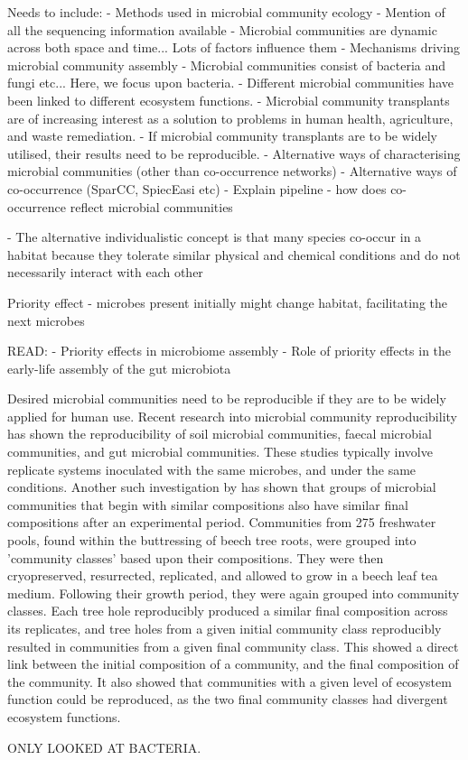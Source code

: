 \documentclass[11pt]{article}
\begin{document}
Needs to include:
- Methods used in microbial community ecology
- Mention of all the sequencing information available
- Microbial communities are dynamic across both space and time... Lots of factors influence them
- Mechanisms driving microbial community assembly
- Microbial communities consist of bacteria and fungi etc... Here, we focus upon bacteria.
- Different microbial communities have been linked to different ecosystem functions.
- Microbial community transplants are of increasing interest as a solution to problems in human health, agriculture, and waste remediation.
- If microbial community transplants are to be widely utilised, their results need to be reproducible.
- Alternative ways of characterising microbial communities (other than co-occurrence networks)
- Alternative ways of co-occurrence (SparCC, SpiecEasi etc)
- Explain pipeline - how does co-occurrence reflect microbial communities

- The alternative individualistic concept is that many species co-occur in a habitat because they tolerate similar physical and chemical conditions and do not necessarily interact with each other \citep{Konopka2009}

Priority effect - microbes present initially might change habitat, facilitating the next microbes \citep{Toju2018}

READ:
- Priority effects in microbiome assembly
- Role of priority effects in the early-life assembly of the gut microbiota

Desired microbial communities need to be reproducible if they are to be widely applied for human use. Recent research into microbial community reproducibility has shown the reproducibility of soil microbial communities, faecal microbial communities, and gut microbial communities. These studies typically involve replicate systems inoculated with the same microbes, and under the same conditions. Another such investigation by \citep{Pascual-Garc} has shown that groups of microbial communities that begin with similar compositions also have similar final compositions after an experimental period. Communities from 275 freshwater pools, found within the buttressing of beech tree roots, were grouped into 'community classes' based upon their compositions. They were then cryopreserved, resurrected, replicated, and allowed to grow in a beech leaf tea medium. Following their growth period, they were again grouped into community classes. Each tree hole reproducibly produced a similar final composition across its replicates, and tree holes from a given initial community class reproducibly resulted in communities from a given final community class. This showed a direct link between the initial composition of a community, and the final composition of the community. It also showed that communities with a given level of ecosystem function could be reproduced, as the two final community classes had divergent ecosystem functions.

ONLY LOOKED AT BACTERIA.



\end{document}
